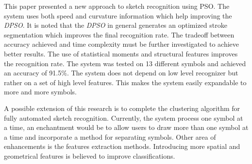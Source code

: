 \documentclass[10pt]{article}
\begin{document}
This paper presented a new approach to sketch recognition using PSO. The system uses both speed and curvature information which help improving the \textit{DPSO}. It is noted that the \textit{DPSO} in general generates an optimized stroke segmentation which improves the final recognition rate.  The tradeoff between accuracy achieved and time complexity must be further investigated to achieve better results. The use of statistical moments and structural features improves the recognition rate. The system was tested on 13 different symbols and achieved an accuracy of 91.5\%. The system does not depend on low level recognizer but rather on a set of high level features. This makes the system easily expandable to more and more symbols. 

 A possible extension of this research is to complete the clustering algorithm for fully automated sketch recognition. Currently, the system process one symbol at a time, an enchantment would be to allow users to draw more than one symbol at a time and incorporate a method for separating symbols. Other area of enhancements is the features extraction methods. Introducing more spatial and geometrical features is believed to improve classifications.  




\end{document}
